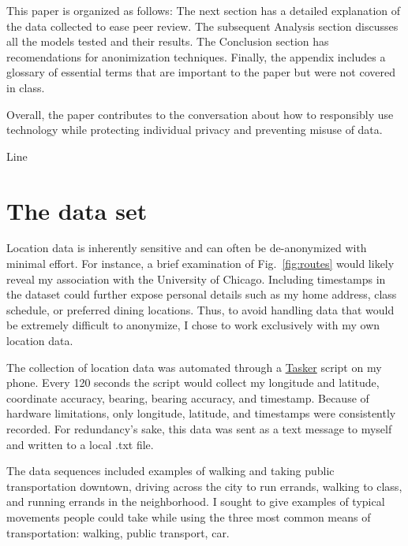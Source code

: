 \documentclass[11pt]{amsart}
\begin{document}
This paper is organized as follows: The next section has a detailed explanation of the data collected to ease peer review.
The subsequent Analysis section discusses all the models tested and their results.
The Conclusion section has recomendations for anonimization techniques.
Finally, the appendix includes a glossary of essential terms that are important to the paper but were not covered in class.

Overall, the paper contributes to the conversation about how to responsibly use technology while protecting individual privacy and preventing misuse of data.

{\color{white}Line}
\section{The data set}

Location data is inherently sensitive and can often be de-anonymized with minimal effort.
For instance, a brief examination of Fig.~\ref{fig:routes} would likely reveal my association with the University of Chicago.
Including timestamps in the dataset could further expose personal details such as my home address, class schedule, or preferred dining locations.
Thus, to avoid handling data that would be extremely difficult to anonymize, I chose to work exclusively with my own location data.

The collection of location data was automated through a \href{https://play.google.com/store/apps/details?id=net.dinglisch.android.taskerm&hl=en_US}{Tasker} script on my phone.
Every 120 seconds the script would collect my longitude and latitude, coordinate accuracy, bearing, bearing accuracy, and timestamp.
Because of hardware limitations, only longitude, latitude, and timestamps were consistently recorded.
For redundancy's sake, this data was sent as a text message to myself and written to a local .txt file.

The data sequences included examples of walking and taking public transportation downtown, driving across the city to run errands, walking to class, and running errands in the neighborhood.
I sought to give examples of typical movements people could take while using the three most common means of transportation: walking, public transport, car.
\end{document}
